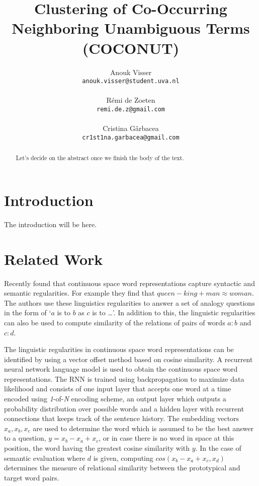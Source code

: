 \documentclass[11pt]{article}
\title{Clustering of Co-Occurring Neighboring Unambiguous Terms (COCONUT)}
\author{Anouk Visser \\
{\tt anouk.visser@student.uva.nl}\\
  \\\And
  R\'emi de Zoeten \\
  {\tt remi.de.z@gmail.com}\\
   \\\And
  Cristina G\^arbacea \\
  {\tt cr1st1na.garbacea@gmail.com}
  \\}
\date{}
\begin{document}
\maketitle
\begin{abstract}
Let's decide on the abstract once we finish the body of the text.
\end{abstract}

\section{Introduction}
The introduction will be here.

\section{Related Work}
Recently \cite{Mikolov:13} found that continuous space word representations capture syntactic and semantic regularities. For example they find that $\textit{queen} - \textit{king} + \textit{man} \approx \textit{woman}$. The authors use these linguistics regularities to answer a set of analogy questions in the form of `$a$ is to $b$ as $c$ is to \dots'. In addition to this, the linguistic regularities can also be used to compute similarity of the relations of pairs of words $a:b$ and $c:d$.

The linguistic regularities in continuous space word representations can be identified by using a vector offset method based on cosine similarity. A recurrent neural network language model is used to obtain the continuous space word representations. The RNN is trained using backpropagation to maximize data likelihood and consists of one input layer that accepts one word at a time encoded using \textit{1}-of-\textit{N} encoding scheme, an output layer which outputs a probability distribution over possible words and a hidden layer with recurrent connections that keeps track of the sentence history. The embedding vectors $x_a, x_b, x_c$ are used to determine the word which is assumed to be the best answer to a question, $y = x_b - x_a + x_c$, or in case there is no word in space at this position, the word having the greatest cosine similarity with $y$. In the case of semantic evaluation where $d$ is given, computing $cos(x_b - x_a + x_c, x_d)$ determines the measure of relational similarity between the prototypical and target word pairs.
\end{document}
